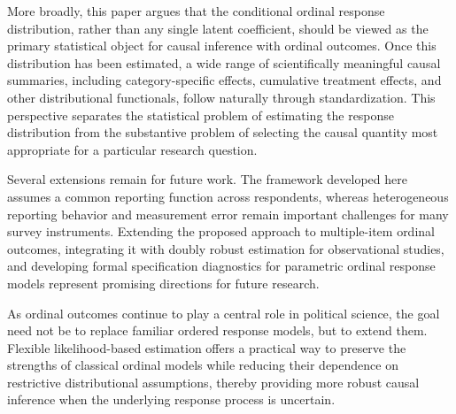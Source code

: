 \documentclass{article}
\begin{document}
More broadly, this paper argues that the conditional ordinal response distribution, rather than any single latent coefficient, should be viewed as the primary statistical object for causal inference with ordinal outcomes. Once this distribution has been estimated, a wide range of scientifically meaningful causal summaries, including category-specific effects, cumulative treatment effects, and other distributional functionals, follow naturally through standardization. This perspective separates the statistical problem of estimating the response distribution from the substantive problem of selecting the causal quantity most appropriate for a particular research question.

Several extensions remain for future work. The framework developed here assumes a common reporting function across respondents, whereas heterogeneous reporting behavior and measurement error remain important challenges for many survey instruments. Extending the proposed approach to multiple-item ordinal outcomes, integrating it with doubly robust estimation for observational studies, and developing formal specification diagnostics for parametric ordinal response models represent promising directions for future research.

As ordinal outcomes continue to play a central role in political science, the goal need not be to replace familiar ordered response models, but to extend them. Flexible likelihood-based estimation offers a practical way to preserve the strengths of classical ordinal models while reducing their dependence on restrictive distributional assumptions, thereby providing more robust causal inference when the underlying response process is uncertain.




\end{document}
